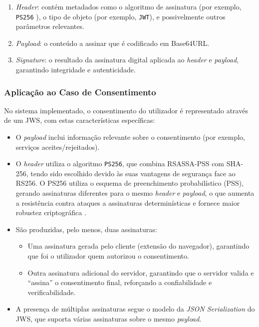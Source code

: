\begin{enumerate}
  \item \textit{Header}: contém metadados como o algoritmo de assinatura (por exemplo, \texttt{PS256} \citep{Auth0SigningAlgorithms}
), o tipo de objeto (por exemplo, \texttt{JWT}), e possivelmente outros parâmetros relevantes.
  \item \textit{Payload}: o conteúdo a assinar que é codificado em Base64URL.
  \item \textit{Signature}: o resultado da assinatura digital aplicada ao \textit{header} e \textit{payload}, garantindo integridade e autenticidade.
\end{enumerate}

\subsubsection{Aplicação ao Caso de Consentimento}

No sistema implementado, o consentimento do utilizador é representado através de um JWS, com estas características específicas:

\begin{itemize}
  \item O \textit{payload} inclui informação relevante sobre o consentimento (por exemplo, serviços aceites/rejeitados).
  \item O \textit{header} utiliza o algoritmo \texttt{PS256}, que combina RSASSA-PSS com SHA-256, tendo sido escolhido devido às suas vantagens de segurança face ao RS256. O PS256 utiliza o esquema de preenchimento probabilístico (PSS), gerando assinaturas diferentes para o mesmo \textit{header} e \textit{payload}, o que aumenta a resistência contra ataques a assinaturas determinísticas e fornece maior robustez criptográfica \citep{ScottBrady2020}.
  \item São produzidas, pelo menos, duas assinaturas:
    \begin{itemize}
      \item Uma assinatura gerada pelo cliente (extensão do navegador), garantindo que foi o utilizador quem autorizou o consentimento.
      \item Outra assinatura adicional do servidor, garantindo que o servidor valida e “assina” o consentimento final, reforçando a confiabilidade e verificabilidade.
    \end{itemize}
  \item A presença de múltiplas assinaturas segue o modelo da \textit{JSON Serialization} do JWS, que suporta várias assinaturas sobre o mesmo \textit{payload}.
\end{itemize}

